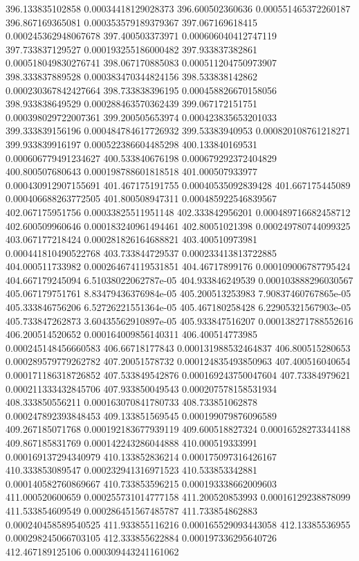 {396.133835102858 0.00034418129028373
396.600502360636 0.000551465372260187
396.867169365081 0.000353579189379367
397.067169618415 0.000245362948067678
397.400503373971 0.000606040412747119
397.733837129527 0.000193255186000482
397.933837382861 0.000518049830276741
398.067170885083 0.000511204750973907
398.333837889528 0.000383470344824156
398.533838142862 0.000230367842427664
398.733838396195 0.000458826670158056
398.933838649529 0.000288463570362439
399.067172151751 0.000398029722007361
399.200505653974 0.000423835653201033
399.333839156196 0.000484784617726932
399.53383940953 0.000820108761218271
399.933839916197 0.000522386604485298
400.133840169531 0.000606779491234627
400.533840676198 0.000679292372404829
400.800507680643 0.000198788601818518
401.000507933977 0.000430912907155691
401.467175191755 0.00040535092839428
401.667175445089 0.000406688263772505
401.800508947311 0.000485922546839567
402.067175951756 0.00033825511951148
402.333842956201 0.000489716682458712
402.600509960646 0.000183240961494461
402.80051021398 0.000249780744099325
403.067177218424 0.000281826164688821
403.400510973981 0.000441810490522768
403.733844729537 0.000233413813722885
404.000511733982 0.000264674119531851
404.46717899176 0.000109006787795424
404.667179245094 6.51038022062787e-05
404.933846249539 0.000103888296030567
405.067179751761 8.83479436376984e-05
405.200513253983 7.90837460767865e-05
405.333846756206 6.52726221551364e-05
405.467180258428 6.22905321567903e-05
405.733847262873 3.60435562910897e-05
405.933847516207 0.000138271788552616
406.200514520652 0.000164009856140311
406.400514773985 0.000245148456660583
406.66718177843 0.000131988532464837
406.800515280653 0.000289579779262782
407.20051578732 0.000124835493850963
407.400516040654 0.000171186318726852
407.533849542876 0.000169243750047604
407.73384979621 0.000211333432845706
407.933850049543 0.000207578158531934
408.333850556211 0.000163070841780733
408.733851062878 0.000247892393848453
409.133851569545 0.000199079876096589
409.267185071768 0.000192183677939119
409.600518827324 0.00016528273344188
409.867185831769 0.000142243286044888
410.000519333991 0.000169137294340979
410.133852836214 0.000175097316426167
410.333853089547 0.000232941316971523
410.533853342881 0.000140582760869667
410.733853596215 0.000193338662009603
411.000520600659 0.000255731014777158
411.200520853993 0.00016129238878099
411.533854609549 0.000286451567485787
411.733854862883 0.000240458589540525
411.933855116216 0.000165529093443058
412.13385536955 0.000298245066703105
412.333855622884 0.000197336295640726
412.467189125106 0.000309443241161062
}
